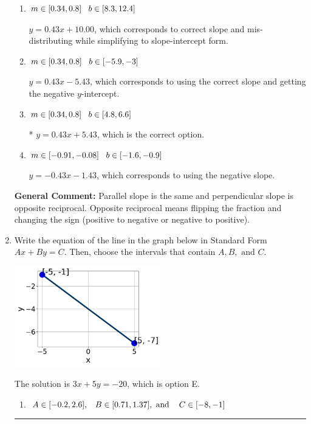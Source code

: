\documentclass{extbook}[14pt]
\newcommand{\litem}[1]{\item #1

\rule{\textwidth}{0.4pt}}
\begin{document}
\begin{enumerate}
{\begin{enumerate}[label=\Alph*.]
 $y = 2.33x + 5.43$, which corresponds to using the reciprocal slope $(1/m)$.
\item \( m \in [0.34, 0.8] \hspace*{3mm} b \in [8.3, 12.4] \)

 $y = 0.43x + 10.00$, which corresponds to correct slope and mis-distributing while simplifying to slope-intercept form.
\item \( m \in [0.34, 0.8] \hspace*{3mm} b \in [-5.9, -3] \)

 $y = 0.43x - 5.43$, which corresponds to using the correct slope and getting the negative $y$-intercept.
\item \( m \in [0.34, 0.8] \hspace*{3mm} b \in [4.8, 6.6] \)

* $y = 0.43x + 5.43$, which is the correct option.
\item \( m \in [-0.91, -0.08] \hspace*{3mm} b \in [-1.6, -0.9] \)

 $y = -0.43x - 1.43$, which corresponds to using the negative slope.
\end{enumerate}

\textbf{General Comment:} Parallel slope is the same and perpendicular slope is opposite reciprocal. Opposite reciprocal means flipping the fraction and changing the sign (positive to negative or negative to positive).
}
\litem{
Write the equation of the line in the graph below in Standard Form $Ax+By=C$. Then, choose the intervals that contain $A, B, \text{ and } C$.

\begin{center}
    \includegraphics[width=0.5\textwidth]{../Figures/linearGraphToStandardB.png}
\end{center}


The solution is \( 3x + 5y = -20 \), which is option E.\begin{enumerate}[label=\Alph*.]
\item \( A \in [-0.2, 2.6], \hspace{3mm} B \in [0.71, 1.37], \text{ and } \hspace{3mm} C \in [-8, -1] \)


\end{enumerate}}
\end{enumerate}
\end{document}
